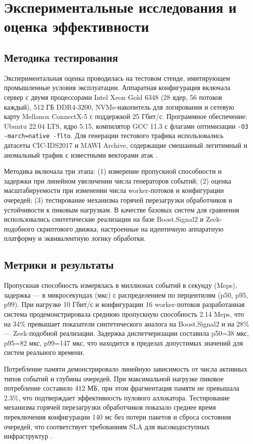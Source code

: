 \section{Экспериментальные исследования и оценка эффективности}
\subsection{Методика тестирования}
Экспериментальная оценка проводилась на тестовом стенде, имитирующем промышленные условия эксплуатации. Аппаратная конфигурация включала сервер с двумя процессорами Intel Xeon Gold 6348 (28 ядер, 56 потоков каждый), 512 ГБ DDR4-3200, NVMe-накопитель для логирования и сетевую карту Mellanox ConnectX-5 с поддержкой 25 Гбит/с. Программное обеспечение: Ubuntu 22.04 LTS, ядро 5.15, компилятор GCC 11.3 с флагами оптимизации \texttt{-O3 -march=native -flto}. Для генерации тестового трафика использовались датасеты CIC-IDS2017 и MAWI Archive, содержащие смешанный легитимный и аномальный трафик с известными векторами атак \cite{sharafaldin2018cic}.

Методика включала три этапа: (1) измерение пропускной способности и задержки при линейном увеличении числа генераторов событий; (2) оценка масштабируемости при изменении числа worker-потоков и конфигурации очередей; (3) тестирование механизма горячей перезагрузки обработчиков и устойчивости к пиковым нагрузкам. В качестве базовых систем для сравнения использовались синтетические реализации на базе Boost.Signal2 и Zeek-подобного скриптового движка, настроенные на идентичную аппаратную платформу и эквивалентную логику обработки.

\subsection{Метрики и результаты}
Пропускная способность измерялась в миллионах событий в секунду (Meps), задержка — в микросекундах (мкс) с распределением по перцентилям (p50, p95, p99). При нагрузке 10 Гбит/с и конфигурации 16 worker-потоков разработанная система продемонстрировала среднюю пропускную способность 2.14 Meps, что на 34\% превышает показатели синтетического аналога на Boost.Signal2 и на 28\% — Zeek-подобной реализации. Задержка диспетчеризации составила p50=38 мкс, p95=82 мкс, p99=147 мкс, что находится в пределах допустимых значений для систем реального времени.

Потребление памяти демонстрировало линейную зависимость от числа активных типов событий и глубины очередей. При максимальной нагрузке пиковое потребление составило 412 МБ, при этом фрагментация памяти не превышала 2.3\%, что подтверждает эффективность пулового аллокатора. Тестирование механизма горячей перезагрузки обработчиков показало среднее время переключения конфигурации 140 мс без потери пакетов и сброса состояния очередей, что соответствует требованиям SLA для высокодоступных инфраструктур \cite{sre2018google}.

